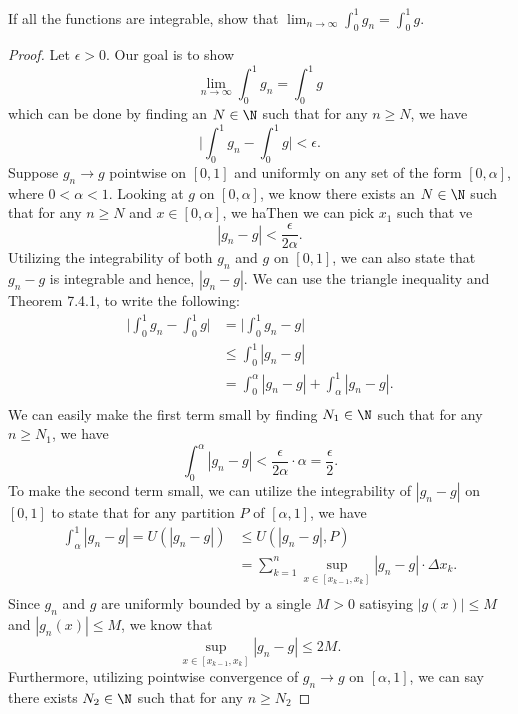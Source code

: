 If all the functions are integrable, show that \( \lim_{ n \to \infty  }  \int_{ 0 }^{ 1 } g_{n} = \int_{ 0 }^{ 1 } g  \).
\begin{proof}
Let \( \epsilon > 0  \). Our goal is to show  
\[  \lim_{ n \to \infty  } \int_{ 0 }^{ 1 } g_{n} = \int_{ 0 }^{ 1 }  g \]
which can be done by finding an \( N \in \N  \) such that for any \(  n \geq N  \), we have 
\[  \Big| \int_{ 0 }^{ 1 } g_{n} - \int_{ 0 }^{ 1 }  g \Big| < \epsilon. \]
Suppose \( g_{n} \to g  \) pointwise on \( [0,1]  \) and uniformly on any set of the form \( [0, \alpha] \), where \( 0 < \alpha < 1  \). Looking at \( g  \) on \( [0, \alpha] \), we know there exists an \(  N \in \N  \) such that for any \( n \geq N  \) and \( x \in [0, \alpha ] \), we haThen we can pick \( x_{1} \) such that ve 
\[  | g_{n} - g  | < \frac{ \epsilon  }{  2 \alpha }.  \] Utilizing the integrability of both \( g_{n} \) and \( g  \) on \( [0,1] \), we can also state that \( g_{n} - g  \) is integrable and hence, \( | g_{n} -g  |  \). We can use the triangle inequality and Theorem 7.4.1, to write the following:
\begin{align*}
    \Big| \int_{ 0 }^{ 1 } g_{n} - \int_{ 0 }^{ 1 } g  \Big| &= \Big| \int_{ 0 }^{ 1 } g_{n} - g   \Big|  \\
															 &\leq \int_{ 0 }^{ 1 } | g_{n} - g  |  \\
															 &= \int_{ 0 }^{ \alpha } | g_{n} - g |  + \int_{ \alpha  }^{ 1 }  | g_{n} - g  |. \\ 
\end{align*}
We can easily make the first term small by finding \( N_{1} \in \N  \) such that for any \( n \geq N_1 \), we have 
\[  \int_{ 0 }^{ \alpha  } | g_{n} -g  |  < \frac{ \epsilon  }{ 2 \alpha  } \cdot \alpha = \frac{ \epsilon  }{ 2 } . \] To make the second term small, we can utilize the integrability of \( | g_{n} -g  |  \) on \( [0,1] \) to state that for any partition \( P \) of \( [\alpha,1]  \), we have 
\begin{align*}
    \int_{ \alpha  }^{ 1 } | g_{n} -g  |  = U(| g_{n} - g  | ) 
										  &\leq U( | g_{n} -g  |, P) \\
										  &= \sum_{ k=1 }^{ n } \sup_{x \in [x_{k-1}, x_k]} | g_{n} - g  | \cdot \Delta x_{k }.\\
\end{align*}
Since \( g_{n}  \) and \( g  \) are uniformly bounded by a single \( M > 0  \) satisying \( | g(x)  |  \leq M  \) and \( | g_{n}(x) | \leq M  \), we know that 
\[  \sup_{x \in [x_{k-1}, x_{k }]} | g_{n} - g  | \leq 2M.\] Furthermore, utilizing pointwise convergence of \( g_{n} \to g  \) on \( [\alpha, 1 ] \), we can say there exists \( N_{2} \in \N  \) such that for any \( n \geq N_{2} \)

\end{proof}
